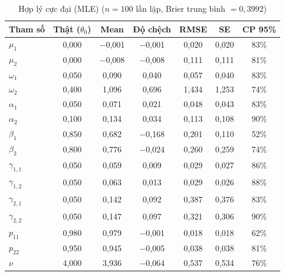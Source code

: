 \documentclass[11pt,a4paper]{article}
\begin{document}
\begin{table}[H]\centering\footnotesize
\caption{Hợp lý cực đại (MLE) ($n=100$ lần lặp, Brier trung bình $=0,3992$)}
\begin{tabularx}{\textwidth}{l C C C C C C}
\toprule
\textbf{Tham số} & \textbf{Thật ($\theta_0$)} & \textbf{Mean} & \textbf{Độ chệch} & \textbf{RMSE} & \textbf{SE} & \textbf{CP 95\%} \\
\midrule
$\mu_1$ & 0,000 & $-$0,001 & $-$0,001 & 0,020 & 0,020 & 83\% \\
$\mu_2$ & 0,000 & $-$0,008 & $-$0,008 & 0,111 & 0,111 & 81\% \\
$\omega_1$ & 0,050 & 0,090 & 0,040 & 0,057 & 0,040 & 83\% \\
$\omega_2$ & 0,400 & 1,096 & 0,696 & 1,434 & 1,253 & 74\% \\
$\alpha_1$ & 0,050 & 0,071 & 0,021 & 0,048 & 0,043 & 83\% \\
$\alpha_2$ & 0,100 & 0,134 & 0,034 & 0,113 & 0,108 & 90\% \\
$\beta_1$ & 0,850 & 0,682 & $-$0,168 & 0,201 & 0,110 & 52\% \\
$\beta_2$ & 0,800 & 0,776 & $-$0,024 & 0,260 & 0,259 & 74\% \\
$\gamma_{1,1}$ & 0,050 & 0,059 & 0,009 & 0,029 & 0,027 & 86\% \\
$\gamma_{1,2}$ & 0,050 & 0,063 & 0,013 & 0,029 & 0,026 & 88\% \\
$\gamma_{2,1}$ & 0,050 & 0,142 & 0,092 & 0,387 & 0,376 & 83\% \\
$\gamma_{2,2}$ & 0,050 & 0,147 & 0,097 & 0,321 & 0,306 & 90\% \\
$p_{11}$ & 0,980 & 0,979 & $-$0,001 & 0,018 & 0,018 & 62\% \\
$p_{22}$ & 0,950 & 0,945 & $-$0,005 & 0,038 & 0,038 & 81\% \\
$\nu$ & 4,000 & 3,936 & $-$0,064 & 0,537 & 0,534 & 76\% \\
\bottomrule
\end{tabularx}
\end{table}
\end{document}
